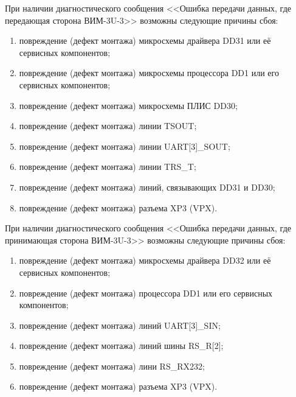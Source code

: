     \subpoint При наличии диагностического сообщения <<Ошибка передачи данных, где передающая сторона ВИМ-3U-3>> возможны следующие причины сбоя:
      \begin{enumerate}
	\item повреждение (дефект монтажа) микросхемы драйвера DD31 или её сервисных компонентов;
	\item повреждение (дефект монтажа) микросхемы процессора DD1 или его сервисных компонентов;
	\item повреждение (дефект монтажа) микросхемы ПЛИС DD30;
	\item повреждение (дефект монтажа) линии TSOUT;
	\item повреждение (дефект монтажа) линии UART[3]\_SOUT;
	\item повреждение (дефект монтажа) линии TRS\_T;
	\item повреждение (дефект монтажа) линий, связывающих DD31 и DD30; 
	\item повреждение (дефект монтажа) разъема XP3 (VPX).
      \end{enumerate}
      
    \subpoint При наличии диагностического сообщения <<Ошибка передачи данных, где принимающая сторона ВИМ-3U-3>> возможны следующие причины сбоя:
      \begin{enumerate}
	\item повреждение (дефект монтажа) микросхемы драйвера DD32 или её сервисных компонентов;
	\item повреждение (дефект монтажа) процессора DD1 или его сервисных компонентов;
	\item повреждение (дефект монтажа) линий UART[3]\_SIN;
	\item повреждение (дефект монтажа) линий шины RS\_R[2];
	\item повреждение (дефект монтажа) лини RS\_RX232;
	\item повреждение (дефект монтажа) разъема XP3 (VPX).
      \end{enumerate} 
      
